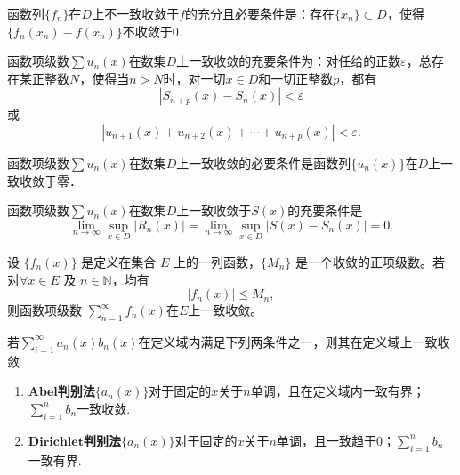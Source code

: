 \documentclass[../../main.tex]{subfiles}%
\begin{document}
\begin{corollary}\label{corollary:函数列不一致收敛的充要条件}
函数列\(\{f_n\}\)在\(D\)上不一致收敛于\(f\)的充分且必要条件是：存在\(\{x_n\} \subset D\)，使得\(\{f_n(x_n) - f(x_n)\}\)不收敛于\(0\).
\end{corollary}

\begin{theorem}[一致收敛的柯西准则]\label{theorem:一致收敛的柯西准则}
函数项级数\(\sum u_n(x)\)在数集\(D\)上一致收敛的充要条件为：对任给的正数\(\varepsilon\)，总存在某正整数\(N\)，使得当\(n > N\)时，对一切\(x \in D\)和一切正整数\(p\)，都有
\[
|S_{n + p}(x) - S_n(x)| < \varepsilon
\]
或
\[
|u_{n + 1}(x) + u_{n + 2}(x) + \cdots + u_{n + p}(x)| < \varepsilon.
\]
\end{theorem}

\begin{corollary}
函数项级数\(\sum u_n(x)\)在数集\(D\)上一致收敛的必要条件是函数列\(\{u_n(x)\}\)在\(D\)上一致收敛于零．
\end{corollary} 

\begin{theorem}
函数项级数\(\sum u_n(x)\)在数集\(D\)上一致收敛于\(S(x)\)的充要条件是
\[
\lim_{n \to \infty} \sup_{x \in D} |R_n(x)| = \lim_{n \to \infty} \sup_{x \in D} |S(x) - S_n(x)| = 0.
\]
\end{theorem}

\begin{theorem}\label{theorem:Weierstrass(魏尔斯特拉斯)判别法}
设 $\{f_n(x)\}$ 是定义在集合 $E$ 上的一列函数，$\{M_n\}$ 是一个收敛的正项级数。若对$\forall x \in E$ 及 $n \in \mathbb{N}$，均有
\[
|f_n(x)| \leqslant M_n,
\]  
则函数项级数 $\sum\limits_{n=1}^{\infty} f_n(x)$在$E$上一致收敛。
\end{theorem}

\begin{theorem}[A-D判别法]\label{theorem:级数一致收敛的A-D判别法}
若\(\sum_{i = 1}^{\infty} a_n(x)b_n(x)\)在定义域内满足下列两条件之一，则其在定义域上一致收敛
\begin{enumerate}[(1)]
\item $\mathbf{Abel}$\textbf{判别法}\(\{a_n(x)\}\)对于固定的\(x\)关于\(n\)单调，且在定义域内一致有界；\(\sum_{i = 1}^{n} b_n\)一致收敛.

\item $\mathbf{Dirichlet}$\textbf{判别法}\(\{a_n(x)\}\)对于固定的\(x\)关于\(n\)单调，且一致趋于\(0\)；\(\sum_{i = 1}^{n} b_n\)一致有界.
\end{enumerate}
\end{theorem}
\end{document}

